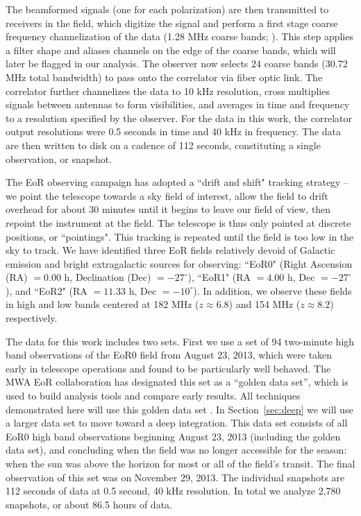 \documentclass[iop]{emulateapj}
\begin{document}
The beamformed signals (one for each polarization) are then transmitted to receivers in 
the field, which digitize the signal and perform a first stage coarse frequency 
channelization of the data (1.28 MHz coarse bands; \citealt{Prabu:2015}). This step 
applies a filter shape and aliases channels on the edge of the coarse bands, which will later be flagged in our analysis. 
The observer now selects 24 coarse bands (30.72 MHz total bandwidth) to pass onto the 
correlator via fiber optic link. The correlator further channelizes the data to 10 kHz 
resolution, cross multiplies signals between antennas to form visibilities, and averages in 
time and frequency to a resolution specified by the observer. For the data in this work, the 
correlator output resolutions were 0.5 seconds in time and 40 kHz in frequency. The data 
are then written to disk on a cadence of 112 seconds, constituting a single observation, or 
snapshot.

The EoR observing campaign has adopted a ``drift and shift" tracking strategy -- we point 
the telescope towards a sky field of interest, allow the field to drift overhead for about 30 
minutes until it begins to leave our field of view, then repoint the instrument at the field. The 
telescope is thus only pointed at discrete positions, or ``pointings". This tracking is 
repeated until the field is too low in the sky to track. We have identified three EoR fields 
relatively devoid of Galactic emission and bright extragalactic sources for observing: 
``EoR0" (Right Ascension (RA) $=0.00$ h, Declination (Dec) $= -27^\circ$), ``EoR1" (RA $=4.00$ h, Dec $= -27^\circ$), 
and ``EoR2" (RA $=11.33$ h, Dec $= -10^\circ$). In addition, we observe these fields in 
high and low bands centered at 182 MHz ($z\approx6.8$) and 154 MHz ($z\approx8.2$) 
respectively.

The data for this work includes two sets. First we use a set of 94 two-minute high band observations of 
the EoR0 field from August 23, 2013, which were taken early in telescope operations and 
found to be particularly well behaved. The MWA EoR collaboration has designated this set 
as a ``golden data set'', which is used to build analysis tools and compare early results. All 
techniques demonstrated here will use this golden data set \cite[e.g.][]{Jacobs:2016, Trott:2016, Pober:2016, Dillon:2015}. In Section~\ref{sec:deep} we 
will use a larger data set to move toward a deep integration. This data set consists of all 
EoR0 high band observations beginning August 23, 2013 (including the golden data set), 
and concluding when the field was no longer accessible for the season: when the sun was 
above the horizon for most or all of the field's transit. The final observation of this set was 
on November 29, 2013. The individual snapshots are 112 seconds of data at 0.5 second, 
40 kHz resolution. In total we analyze 2,780 snapshots, or about 86.5 hours of data.
\end{document}
